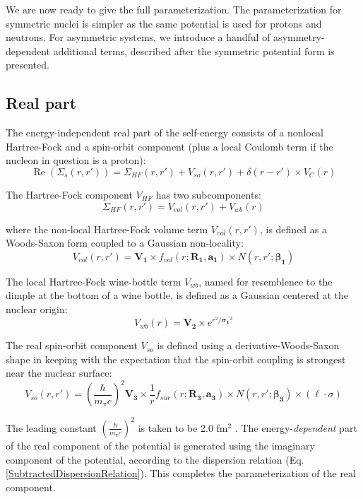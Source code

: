We are now ready to give the full parameterization. The parameterization for symmetric nuclei
is simpler as the same potential is used for protons and neutrons. For asymmetric systems, we
introduce a handful of asymmetry-dependent additional terms, described after the symmetric potential
form is presented.

\subsection{Real part}
The energy-independent real part of the self-energy consists of a nonlocal Hartree-Fock and
a spin-orbit component (plus a local Coulomb term if the nucleon in question is a proton):
\begin{equation}
    \operatorname{Re}({\Sigma}_{s}(r,r')) = \Sigma_{HF}(r,r')+V_{so}(r,r')+\delta(r-r')\times V_{C}(r)
\end{equation}

\noindent
The Hartree-Fock component $V_{HF}$ has two subcomponents:
\begin{equation}
    \Sigma_{HF}(r,r') = V_{vol}(r,r') + V_{wb}(r)
\end{equation}

\noindent
where the non-local Hartree-Fock volume term $V_{vol}(r,r')$, is defined as
a Woods-Saxon form coupled to a Gaussian non-locality:
\begin{equation} \label{RealVolume}
    V_{vol}(r,r') = \bm{V_{1}}{\times}f_{vol}(r; \bm{R_{1}}, \bm{a_{1}})
    {\times}N(r,r';\bm{\beta_{1}})
\end{equation}

The local Hartree-Fock wine-bottle
term $V_{wb}$, named for resemblence to the dimple at the bottom of a wine
bottle, is defined as a Gaussian centered at the nuclear origin:
\begin{equation}
    V_{wb}(r) = \bm{V_{2}}{\times}e^{r^{2}/\bm{\sigma_{1}}^{2}}
\end{equation}

\noindent
The real spin-orbit component $V_{so}$
is defined using a derivative-Woods-Saxon shape in keeping with the
expectation that the spin-orbit coupling is strongest near the
nuclear surface:
\begin{equation}
    V_{so}(r,r') = \left(\frac{\hbar}{m_{\pi}c}\right)^{2}
    \bm{V_{3}}\times\frac{1}{r}f_{sur}(r;\bm{R_{3}}, \bm{a_{3}}){\times}N(r,r';\bm{\beta_{3}})
    {\times}(\ell\cdot\sigma)
\end{equation}

\noindent
The leading constant $\left(\frac{\hbar}{m_{\pi}c}\right)^{2}$ is taken to be 2.0 fm$^{2}$
\cite{MahzoonPhDThesis}.
The energy-\textit{dependent} part of the real component of the potential is generated
using the imaginary component of the potential, according to the dispersion relation (Eq.
\ref{SubtractedDispersionRelation}). This completes the parameterization of the real component.

